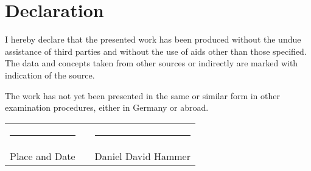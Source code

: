 \documentclass[class=report, crop=false]{standalone}
\begin{document}
\chapter*{Declaration}\label{cha:declaration}
\thispagestyle{empty}

I hereby declare that the presented work has been produced without the undue assistance of third parties and without the use of aids other than those specified. The data and concepts taken from other sources or indirectly are marked with indication of the source.

The work has not yet been presented in the same or similar form in other examination procedures, either in Germany or abroad.

\vspace{1.5cm}


\hspace{1.5cm}

\begin{center}
\noindent
\begin{tabular}{lcl}
    \rule{5cm}{1pt} & \hspace{2cm} & \rule{5cm}{1pt} \\
    Place and Date & & Daniel David Hammer
\end{tabular}
\vspace{1cm}
\end{center}
\end{document}
